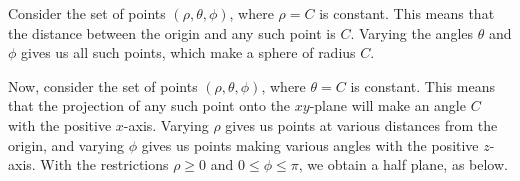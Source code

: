 \documentclass{ximera}
\begin{document}
Consider the set of points $(\rho, \theta, \phi)$, where $\rho = C$ is constant. This means that the distance between the origin and any such point is $C$. Varying the angles $\theta$ and $\phi$ gives us all such points, which make a sphere of radius $C$.

\begin{image}
\end{image}

Now, consider the set of points $(\rho, \theta, \phi)$, where $\theta = C$ is constant. This means that the projection of any such point onto the $xy$-plane will make an angle $C$ with the positive $x$-axis. Varying $\rho$ gives us points at various distances from the origin, and varying $\phi$ gives us points making various angles with the positive $z$-axis. With the restrictions $\rho\geq 0$ and $0\leq \phi\leq\pi$, we obtain a half plane, as below.
\end{document}
